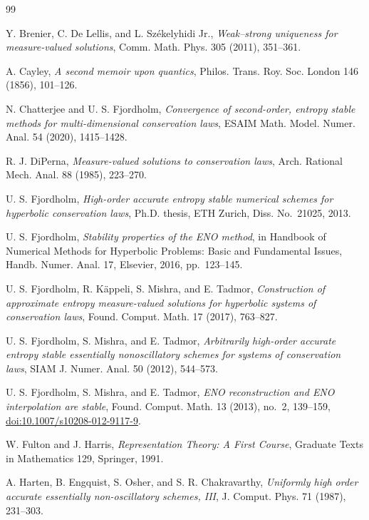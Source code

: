 \documentclass[11pt]{amsart}
\theoremstyle{plain}
\theoremstyle{definition}
\theoremstyle{remark}
\numberwithin{equation}{section}
\theoremstyle{plain}
\begin{document}
\begin{thebibliography}{99}

Y. Brenier, C. De Lellis, and L. Sz\'ekelyhidi Jr.,
\emph{Weak--strong uniqueness for measure-valued solutions},
Comm. Math. Phys. 305 (2011), 351--361.

A. Cayley,
\emph{A second memoir upon quantics},
Philos. Trans. Roy. Soc. London 146 (1856), 101--126.

N. Chatterjee and U. S. Fjordholm,
\emph{Convergence of second-order, entropy stable methods for
multi-dimensional conservation laws},
ESAIM Math. Model. Numer. Anal. 54 (2020), 1415--1428.


R. J. DiPerna,
\emph{Measure-valued solutions to conservation laws},
Arch. Rational Mech. Anal. 88 (1985), 223--270.

U. S. Fjordholm,
\emph{High-order accurate entropy stable numerical schemes for hyperbolic
conservation laws},
Ph.D. thesis, ETH Zurich, Diss. No.~21025, 2013.

U. S. Fjordholm,
\emph{Stability properties of the ENO method},
in Handbook of Numerical Methods for Hyperbolic Problems: Basic and
Fundamental Issues, Handb. Numer. Anal. 17, Elsevier, 2016, pp.~123--145.

U. S. Fjordholm, R. K\"appeli, S. Mishra, and E. Tadmor,
\emph{Construction of approximate entropy measure-valued solutions for
hyperbolic systems of conservation laws},
Found. Comput. Math. 17 (2017), 763--827.

U. S. Fjordholm, S. Mishra, and E. Tadmor,
\emph{Arbitrarily high-order accurate entropy stable essentially
nonoscillatory schemes for systems of conservation laws},
SIAM J. Numer. Anal. 50 (2012), 544--573.

U. S. Fjordholm, S. Mishra, and E. Tadmor,
\emph{ENO reconstruction and ENO interpolation are stable},
Found. Comput. Math. 13 (2013), no.~2, 139--159,
\href{https://doi.org/10.1007/s10208-012-9117-9}{doi:10.1007/s10208-012-9117-9}.

W. Fulton and J. Harris,
\emph{Representation Theory: A First Course},
Graduate Texts in Mathematics 129, Springer, 1991.


A. Harten, B. Engquist, S. Osher, and S. R. Chakravarthy,
\emph{Uniformly high order accurate essentially non-oscillatory schemes, III},
J. Comput. Phys. 71 (1987), 231--303.


\end{thebibliography}
\end{document}
